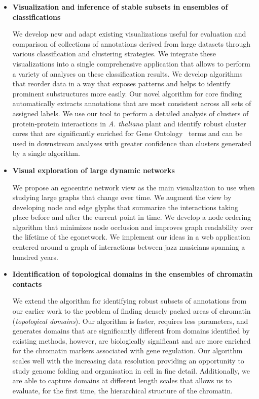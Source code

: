 \begin{itemize}
  \item \textbf{Visualization and inference of stable subsets in ensembles of classifications}

  We develop new and adapt existing visualizations useful for evaluation and comparison of collections of annotations derived from large datasets through various classification and clustering strategies. We integrate these visualizations into a single comprehensive application that allows to perform a variety of analyses on these classification results. We develop algorithms that reorder data in a way that exposes patterns and helps to identify prominent substructures more easily. Our novel algorithm for core finding automatically extracts annotations that are most consistent across all sets of assigned labels. We use our tool to perform a detailed analysis of clusters of protein-protein interactions in \textit{A. thaliana} plant and identify robust cluster cores that are significantly enriched for Gene Ontology~\cite{GeneOntology} terms and can be used in downstream analyses with greater confidence than clusters generated by a single algorithm.


  \item \textbf{Visual exploration of large dynamic networks}

  We propose an egocentric network view as the main visualization to use when  studying large graphs that change over time. We augment the view by developing node and edge glyphs that summarize the interactions taking place before and after the current point in time. We develop a node ordering algorithm that minimizes node occlusion and improves graph readability over the lifetime of the egonetwork. We implement our ideas in a web application centered around a graph of interactions between jazz musicians spanning a hundred years.

  \item \textbf{Identification of topological domains in the ensembles of chromatin contacts}

  We extend the algorithm for identifying robust subsets of annotations from our earlier work to the problem of finding densely packed areas of chromatin (\textit{topological domains}). Our algorithm is faster, requires less parameters, and generates domains that are significantly different from domains identified by existing methods, however, are biologically significant and are more enriched for the chromatin markers associated with gene regulation. Our algorithm scales well with the increasing data resolution providing an opportunity to study genome folding and organisation in cell in fine detail. Additionally, we are able to capture domains at different length scales that allows us to evaluate, for the first time, the hierarchical structure of the chromatin.


\end{itemize}
